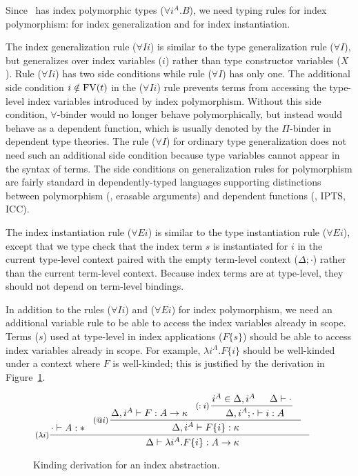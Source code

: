 Since \Fi\ has index polymorphic types ($\forall i^A . B$),
we need typing rules for index polymorphism:
 for index generalization
and  for index instantiation.

The index generalization rule ($\forall I i$) is similar to
the type generalization rule ($\forall I$), but generalizes over
index variables ($i$) rather than type constructor variables ($X$).
Rule ($\forall I i$) has two side conditions
while rule ($\forall I$) has only one.
The additional side condition $i\notin\mathop{\mathrm{FV}}(t)$ in the ($\forall I i$) rule
prevents terms from accessing the type-level index variables introduced by
index polymorphism. Without this side condition, $\forall$-binder
would no longer behave polymorphically, but instead would behave as
a dependent function, which is usually denoted by the $\Pi$-binder in
dependent type theories. The rule ($\forall I$) for ordinary
type generalization does not need such an additional side condition
because type variables cannot appear in the syntax of terms.
The side conditions on generalization rules for polymorphism are fairly standard
in dependently-typed languages supporting distinctions between polymorphism
(\ie, erasable arguments) and dependent functions (\eg, IPTS\cite{LingerS08},
ICC\cite{Miquel01}).

The index instantiation rule ($\forall E i$) is similar to
the type instantiation rule ($\forall E i$), except that
we type check that the index term $s$ is instantiated for $i$
in the current type-level context paired with the empty term-level context
($\Delta;\cdot$) rather than the current term-level context.
Because index terms are at type-level, they should not depend on
term-level bindings.

In addition to the rules ($\forall I i$) and ($\forall E i$) for
index polymorphism, we need an additional variable rule 
to be able to access the index variables already in scope. Terms ($s$) used
at type-level in index applications ($F\{s\}$) should be able to access
index variables already in scope. For example, $\lambda i^A.F\{i\}$ should be
well-kinded under a context where $F$ is well-kinded; this is justified by
the derivation in Figure~\ref{fig:ivarexample}.

\begin{figure}
\[ \!\!\!\!\!\!\!\!\inference[($\lambda i$)]
      { \!\!\!\! \cdot |- A:* \!\!\!\!&
	\inference[($@i$)\!\!\!]{ \!\!\!\!\Delta, i^A |- F : A -> \kappa
                          & \!\!\!\!\inference[($:i$)\!\!\!]{\!\!\!\! i^A\in \Delta,i^A
                                              & \Delta |- \cdot \!\!\!\!}
                                              {\Delta,i^A;\cdot |- i:A\!\!\!\!}
                          }
                          {\Delta, i^A |- F\{i\} : \kappa} }
      {\Delta |- \lambda i^A.F\{i\} :A -> \kappa\!\!\!\!\!\!\!\!\!\!\!\!\!\!\!\!}
\]
\caption{Kinding derivation for an index abstraction.}
\label{fig:ivarexample}
\end{figure}

